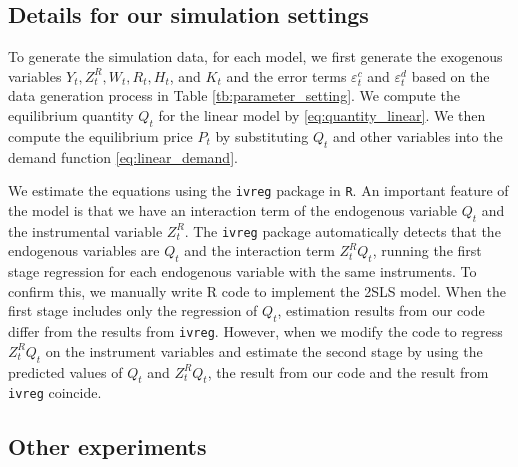 \documentclass[11pt, a4paper]{article}
\begin{document}
\subsection{Details for our simulation settings}

To generate the simulation data, for each model, we first generate the exogenous variables $Y_t, Z^{R}_{t}, W_t, R_{t}, H_t$, and $K_t$ and the error terms $\varepsilon_{t}^c$ and $\varepsilon_{t}^d$ based on the data generation process in Table \ref{tb:parameter_setting}.
We compute the equilibrium quantity $Q_{t}$ for the linear model by \eqref{eq:quantity_linear}.
We then compute the equilibrium price $P_t$ by substituting $Q_{t}$ and other variables into the demand function \eqref{eq:linear_demand}.

We estimate the equations using the \texttt{ivreg} package in \texttt{R}.
An important feature of the model is that we have an interaction term of the endogenous variable $Q_{t}$ and the instrumental variable $Z^{R}_{t}$.
The \texttt{ivreg} package automatically detects that the endogenous variables are $Q_{t}$ and the interaction term $Z^{R}_{t}Q_{t}$, running the first stage regression for each endogenous variable with the same instruments. To confirm this, we manually write R code to implement the 2SLS model. 
When the first stage includes only the regression of $Q_{t}$, estimation results from our code differ from the results from \texttt{ivreg}. 
However, when we modify the code to regress $Z^{R}_{t}Q_{t}$ on the instrument variables and estimate the second stage by using the predicted values of $Q_{t}$ and $Z^{R}_{t}Q_{t}$, the result from our code and the result from \texttt{ivreg} coincide.


\subsection{Other experiments}
\end{document}
